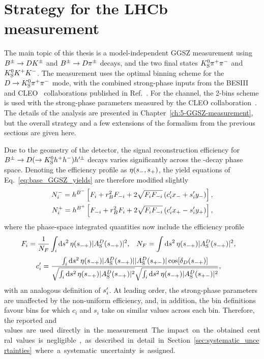 





\section{Strategy for the LHCb measurement} %
\label{sec:strategy_for_lhcb_measurement}

The main topic of this thesis is a model-independent GGSZ measurement using ${{{B}^\pm}\rightarrow{\ensuremath{D}}{\ensuremath{{K}^\pm}}}$ and ${{{B}^\pm}\rightarrow{\ensuremath{D}}{\ensuremath{{\pi}^\pm}}}$ decays, and the two \D final states ${{K}^0_{\mathrm{S}}}{{\pi}^+}{{\pi}^-}$ and ${{K}^0_{\mathrm{S}}}{{K}^+}{{K}^-}$. The measurement uses the optimal binning scheme for the ${D\rightarrow{\ensuremath{{K}^0_{\mathrm{S}}}}{\ensuremath{{\pi}^+}}{\ensuremath{{\pi}^-}}}$ mode, with the combined strong-phase inputs from the BESIII~\cite{} and CLEO~\cite{} collaborations published in Ref.~\cite{}. For the \DtoKsKK channel, the 2-bins scheme is used with the strong-phase parameters measured by the CLEO collaboration~\cite{}. The details of the analysis are presented in Chapter~\eqref{ch:5-GGSZ-measurement}, but the overall strategy and a few extensions of the formalism from the previous sections are given here.

Due to the geometry of the \lhcb detector, the signal reconstruction efficiency for ${{B}^\pm}\rightarrow{\ensuremath{D}}(\rightarrow{\ensuremath{{K}^0_{\mathrm{S}}}} h^+h^-)h'^\pm$ decays varies significantly across the \D-decay phase space. Denoting the efficiency profile as $\eta(s_-, s_+)$, the yield equations of Eq.~\eqref{eq:base_GGSZ_yields} are therefore modified slightly
\begin{align}
\begin{split}    \label{eq:lhcb_GGSZ_yields}
    N^-_i = h^{{{B}^-}} \left[F_i + r_{B}^2F_{-i} + 2\sqrt{F_iF_{-i}}\left(c_i'x_-+s_i'y_-\right)\right], \\
    N^+_i = h^{{{B}^+}} \left[F_{-i} + r_{B}^2F_i + 2\sqrt{F_iF_{-i}}\left(c_i'x_+-s_i'y_+\right)\right],
\end{split}
\end{align}
where the phase-space integrated quantities now include the efficiency profile
\begin{align}\label{eq:Fi_def}
    F_i &= \frac{1}{N_F}\int_i\text{d}s^2 \,\eta(s_{-+})|A_{\rm S}^{D}(s_{-+})|^2, &
    N_F &=\int\text{d}s^2 \,\eta(s_{-+})|A_{\rm S}^{D}(s_{-+})|^2,
\end{align}
\begin{align}\label{eq:ci_si_with_eff}
\begin{split}
    c_i' &= \frac
    {\int_i \text{d}s^2 \,\eta(s_{-+})|A_{\rm S}^{D}(s_{-+})||A_{\rm S}^{D}(s_{+-})|\cos[\delta_D(s_{-+})]}
    {\sqrt{\int_i \text{d}s^2 \,\eta(s_{-+})|A_{\rm S}^{D}(s_{-+})|^2}\sqrt{\int_i \text{d}s^2 \,\eta(s_{-+})|A_{\rm S}^{D}(s_{+-})|^2}},
\end{split}
\end{align}
with an analogous definition of $s_i'$. At leading order, the strong-phase parameters are unaffected by the non-uniform efficiency, and, in addition, the bin definitions favour bins for which $c_i$ and $s_i$ take on similar values across each bin.  Therefore, the reported \ci and \si values are used directly in the measurement. The impact on the obtained central values is negligible, as described in detail in Section~\ref{sec:systematic_uncertainties} where a systematic uncertainty is assigned. 

